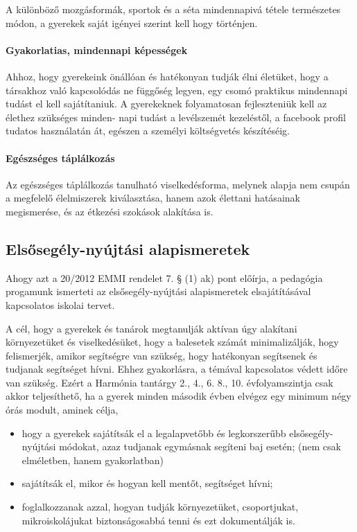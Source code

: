 A különböző mozgásformák, sportok és a séta mindennapivá tétele
természetes módon, a gyerekek saját igényei szerint kell hogy történjen.

\paragraph{Gyakorlatias, mindennapi
      képességek}\label{gyakorlatias-mindennapi-kuxe9pessuxe9gek}

Ahhoz, hogy gyerekeink önállóan és hatékonyan tudják élni életüket, hogy
a társakhoz való kapcsolódás ne függőség legyen, egy csomó praktikus
mindennapi tudást el kell sajátítaniuk. A gyerekeknek folyamatosan
fejleszteniük kell az élethez szükséges minden- napi tudást a
levélszemét kezeléstől, a facebook profil tudatos használatán át,
egészen a személyi költségvetés készítéséig.

\paragraph{Egészséges
      táplálkozás}

Az egészséges táplálkozás tanulható viselkedésforma, melynek alapja nem
csupán a megfelelő élelmiszerek kiválasztása, hanem azok élettani
hatásainak megismerése, és az étkezési szokások alakítása is.

\subsection{Elsősegély-nyújtási alapismeretek}
\label{sec:elsosegely}
Ahogy azt a 20/2012 EMMI rendelet 7. § (1) ak) pont előírja, a pedagógia
progamunk ismerteti az elsősegély-nyújtási alapismeretek elsajátításával
kapcsolatos iskolai tervet.

A cél, hogy a gyerekek és tanárok megtanulják aktívan úgy alakítani
környezetüket és viselkedésüket, hogy a balesetek számát minimalizálják, hogy
felismerjék, amikor segítségre van szükség, hogy hatékonyan segítsenek és
tudjanak segítséget hívni. Ehhez gyakorlásra, a témával kapcsolatos
védett időre van szükség. Ezért a Harmónia tantárgy 2., 4., 6. 8., 10.
évfolyamszintja csak akkor teljesíthető,
ha a gyerek minden második évben elvégez egy minimum négy órás modult, aminek
célja,
\begin{itemize}
      \item hogy a gyerekek sajátítsák el a legalapvetőbb és legkorszerűbb
            elsősegély-nyújtási
            módokat, azaz tudjanak egymásnak segíteni baj esetén; (nem csak
            elméletben,
            hanem gyakorlatban)
      \item sajátítsák el, mikor és hogyan kell mentőt, segítséget hívni;
      \item foglalkozzanak azzal, hogyan tudják környezetüket, csoportjukat,
            mikroiskolájukat
            biztonságosabbá tenni és ezt dokumentálják is.
\end{itemize}

